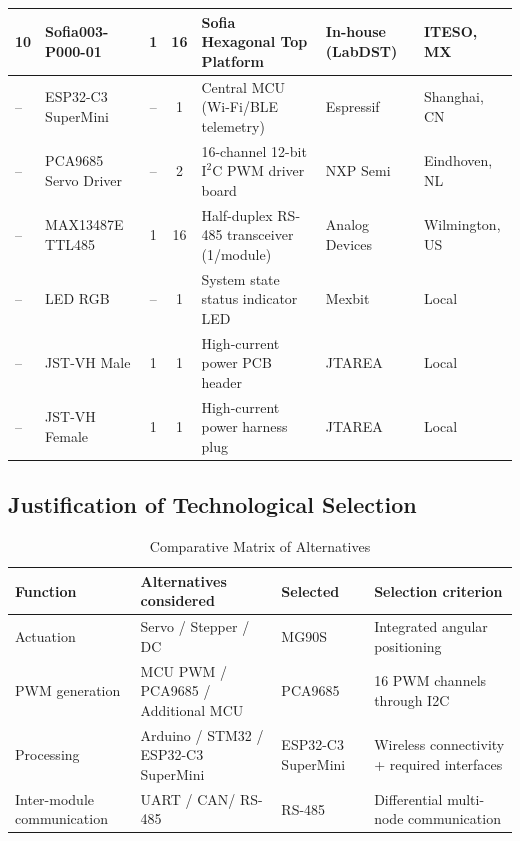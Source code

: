 \documentclass[lettersize,journal]{IEEEtran}
\begin{document}
\begin{table}[!t]
\begin{tabularx}{\columnwidth}{@{}P{0.8cm} P{2.0cm} c c X P{1.1cm} P{0.8cm}@{}}
			10 & Sofia003-P000-01 & 1 & 16 & Sofia Hexagonal Top Platform & In-house (LabDST) & ITESO, MX \\
			\midrule
			-- & ESP32-C3 SuperMini & -- & 1 & Central MCU (Wi-Fi/BLE telemetry) & Espressif & Shanghai, CN \\
			-- & PCA9685 Servo Driver & -- & 2 & 16-channel 12-bit $\text{I}^2\text{C}$ PWM driver board & NXP Semi & Eindhoven, NL \\
			-- & MAX13487E TTL485 & 1 & 16 & Half-duplex RS-485 transceiver (1/module) & Analog Devices & Wilmington, US \\
			-- & LED RGB & -- & 1 & System state status indicator LED & Mexbit & Local \\
			-- & JST-VH Male & 1 & 1 & High-current power PCB header & JTAREA & Local \\
			-- & JST-VH Female & 1 & 1 & High-current power harness plug & JTAREA & Local \\
			
			\bottomrule
		\end{tabularx}
	\end{table}
	
	\subsection{Justification of Technological Selection}
	
	\begin{table}[!t]
		\centering
		\caption{Comparative Matrix of Alternatives}
		\label{tab:comparative_matrix}
		\scriptsize
		
		\setlength{\tabcolsep}{2pt}
		\renewcommand{\arraystretch}{1.05}
		
		\begin{tabularx}{\columnwidth}
			{@{}P{2cm} P{1.7cm} P{2cm} Y@{} }
			
			\toprule
			Function & Alternatives considered & Selected & Selection criterion \\
			\midrule
			
			Actuation & Servo / Stepper / DC & MG90S & Integrated angular positioning \\
			
			PWM generation & MCU PWM / PCA9685 / Additional MCU & PCA9685 & 16 PWM channels through I2C \\
			
			Processing & Arduino / STM32 / ESP32-C3 SuperMini & ESP32-C3 SuperMini & Wireless connectivity + required interfaces \\
			
			Inter-module communication & UART / CAN/ RS-485 & RS-485 & Differential multi-node communication \\
			
			
			\bottomrule
			
		\end{tabularx}
		
	\end{table}
	
\end{document}
